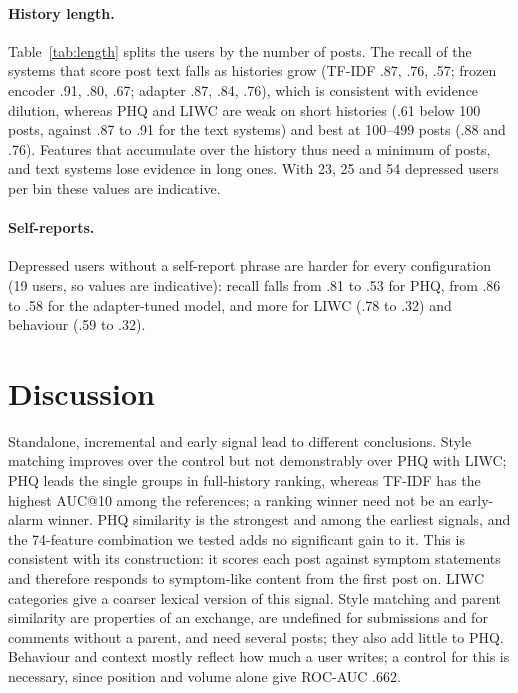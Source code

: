 \documentclass[11pt]{article}
\begin{document}
\paragraph{History length.}
Table~\ref{tab:length} splits the users by the number of posts.
The recall of the systems that score post text falls as histories grow (TF-IDF .87, .76, .57; frozen encoder .91, .80, .67; adapter .87, .84, .76), which is consistent with evidence dilution, whereas PHQ and LIWC are weak on short histories (.61 below 100 posts, against .87 to .91 for the text systems) and best at 100--499 posts (.88 and .76).
Features that accumulate over the history thus need a minimum of posts, and text systems lose evidence in long ones.
With 23, 25 and 54 depressed users per bin these values are indicative.

\begin{table}[t]
\centering\scriptsize\setlength{\tabcolsep}{3pt}

\caption{Recall of depressed users (false-alarm rate of control users) by number of posts per user (depressed/control users in parentheses); decisions as in Table~\ref{tab:errors}.}
\label{tab:length}
\end{table}

\paragraph{Self-reports.}
Depressed users without a self-report phrase are harder for every configuration (19 users, so values are indicative): recall falls from .81 to .53 for PHQ, from .86 to .58 for the adapter-tuned model, and more for LIWC (.78 to .32) and behaviour (.59 to .32).

\section{Discussion}

Standalone, incremental and early signal lead to different conclusions.
Style matching improves over the control but not demonstrably over PHQ with LIWC; PHQ leads the single groups in full-history ranking, whereas TF-IDF has the highest AUC@10 among the references; a ranking winner need not be an early-alarm winner.
PHQ similarity is the strongest and among the earliest signals, and the 74-feature combination we tested adds no significant gain to it.
This is consistent with its construction: it scores each post against symptom statements and therefore responds to symptom-like content from the first post on.
LIWC categories give a coarser lexical version of this signal.
Style matching and parent similarity are properties of an exchange, are undefined for submissions and for comments without a parent, and need several posts; they also add little to PHQ.
Behaviour and context mostly reflect how much a user writes; a control for this is necessary, since position and volume alone give ROC-AUC .662.
\end{document}
